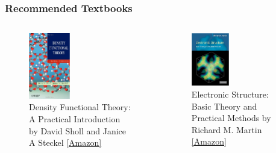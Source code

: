 \documentclass[aspectratio=169]{beamer}
\begin{document}
    \begin{frame}
        \frametitle{Recommended Textbooks}

        \begin{columns}
            \begin{figure}
                \centering
                \includegraphics[width=0.4\textwidth]{lectures/figures/0_DFT_a_practical_introduction.png}
                \caption{Density Functional Theory: A Practical Introduction by David Sholl and Janice A Steckel
                \href{https://www.amazon.com/Density-Functional-Theory-Practical-Introduction-ebook/dp/B005PS4Z3A}{[Amazon]}}
            \end{figure}
            \begin{figure}
                \centering
                \includegraphics[width=0.4\textwidth]{lectures/figures/0_martin_electronic_structure.png}
                \caption{Electronic Structure: Basic Theory and Practical Methods by Richard M. Martin
                \href{https://www.amazon.com/Electronic-Structure-Theory-Practical-Methods/dp/0521534402 }{[Amazon]}}
            \end{figure}
        \end{columns}
    \end{frame}
\end{document}
